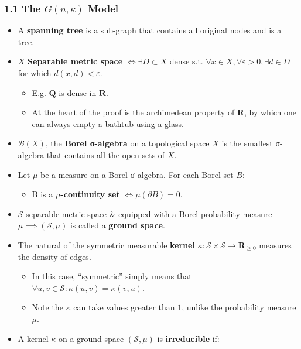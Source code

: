 \documentclass[
  letterpaper,
  DIV=11,
  numbers=noendperiod]{scrartcl}
\providecommand{\tightlist}{%
  \setlength{\itemsep}{0pt}\setlength{\parskip}{0pt}}\usepackage{longtable,booktabs,array}
\begin{document}
\subsubsection{\texorpdfstring{1.1 The \(G(n, \kappa)\)
Model}{1.1 The G(n, \textbackslash kappa) Model}}\label{the-gn-kappa-model}

\begin{itemize}
\item
  A \textbf{spanning tree} is a sub-graph that contains all original
  nodes and is a tree.
\item
  \(X\) \textbf{Separable metric space} \(\iff \exists D \subset X\)
  dense s.t.
  \(\forall x \in X, \forall \varepsilon > 0, \exists d \in D\) for
  which \(d(x, d) < \varepsilon.\)

  \begin{itemize}
  \item
    E.g. \(\mathbf{Q}\) is dense in \(\mathbf{R}.\)
  \item
    At the heart of the proof is the archimedean property of
    \(\mathbf{R}\), by which one can always empty a bathtub using a
    glass.
  \end{itemize}
\item
  \(\mathcal{B} (X)\), the \textbf{Borel σ-algebra} on a topological
  space \(X\) is the smallest σ-algebra that contains all the open sets
  of \(X\).
\item
  Let \(\mu\) be a measure on a Borel σ-algebra. For each Borel set
  \(B\):

  \begin{itemize}
  \tightlist
  \item
    B is a \(\mu\)\textbf{-continuity set} \(\iff \mu(\partial B) = 0.\)
  \end{itemize}
\item
  \(\mathcal{S}\) separable metric space \& equipped with a Borel
  probability measure \(\mu \implies (\mathcal{S}, \mu)\) is called a
  \textbf{ground space}.
\item
  The natural of the symmetric measurable \textbf{kernel}
  \(\kappa: \mathcal{S}\times \mathcal{S}\to \mathbf{R}_{\geq 0}\)
  measures the density of edges.

  \begin{itemize}
  \tightlist
  \item
    In this case, ``symmetric'' simply means that
    \(\forall u, v \in \mathcal{S}: \kappa(u, v) = \kappa(v, u).\)
  \item
    Note the \(\kappa\) can take values greater than \(1\), unlike the
    probability measure \(\mu\).
  \end{itemize}
\item
  A kernel \(\kappa\) on a ground space \((\mathcal{S}, \mu)\) is
  \textbf{irreducible} if:


\end{itemize}
\end{document}
